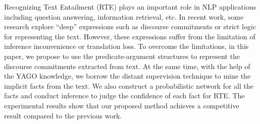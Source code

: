 Recognizing Text Entailment (RTE) plays an important role in NLP applications including question answering, information retrieval, etc. In recent work, some research explore  ``deep'' expressions such as discourse commitments or strict logic for representing the text. However, these expressions suffer from the limitation of inference inconvenience or translation loss. To overcome the limitations, in this paper, we propose to use the predicate-argument structures to represent the discourse commitments extracted from text. At the same time, with the help of the YAGO knowledge, we borrow the distant supervision technique to mine the implicit facts from the text. We also construct a probabilistic network for all the facts and conduct inference to judge the confidence of each fact for RTE. The experimental results show that our proposed method achieves a competitive result compared to the previous work.
